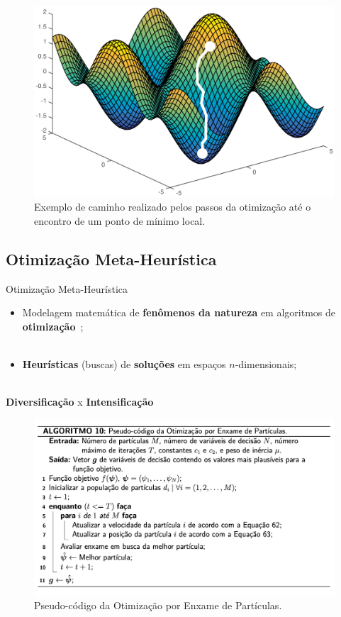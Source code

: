 \begin{frame}
	\begin{figure}
		\centering
		\includegraphics[scale=0.45]{figs/opt_function_opt.eps}	
		\caption{Exemplo de caminho realizado pelos passos da otimização até o encontro de um ponto de mínimo local.}
		\label{f.opt_function_opt}
	\end{figure}
\end{frame}

\subsection{Otimização Meta-Heurística}
\label{ss.optimization_mh}

\begin{frame}{Otimização Meta-Heurística}
	\begin{itemize}
		\justifying
		\item Modelagem matemática de \textbf{fenômenos da natureza} em algoritmos de \textbf{otimização}~\cite{yang_review};
		\\~\\
		\item \textbf{Heurísticas} (buscas) de \textbf{soluções} em espaços $n$-dimensionais;
		\\~\\
	\end{itemize}
	\vspace*{0.5cm}
	\begin{block}{}
		\centering
		\textbf{Diversificação} x \textbf{Intensificação}
	\end{block}	
\end{frame}

\begin{frame}
	\begin{figure}
		\centering
		\includegraphics[scale=0.375]{figs/pso.png}	
		\caption{Pseudo-código da Otimização por Enxame de Partículas.}
		\label{f.pso}
	\end{figure}
\end{frame}